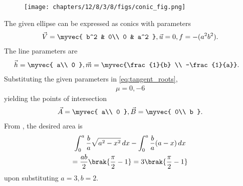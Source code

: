 	\begin{figure}[H]
		\centering
 \texttt{[image: chapters/12/8/3/8/figs/conic\_fig.png]}
		\caption{}
		\label{fig:12/8/3/8}
  	\end{figure}
The given ellipse can be expressed as conics with parameters
\begin{align}
\vec{V}=\myvec{
b^2 & 0\\
0 & a^2
},
\vec{u}=0,
f=-(a^2b^2).
\end{align} 
The line parameters are
\begin{align}
\vec{h} &= \myvec{
a\\
0
},
\vec{m} = \myvec{\frac{1}{b} \\ -\frac{1}{a}}.
\end{align}
Substituting the given parameters in \eqref{eq:tangent_roots},
\begin{align}
    \mu=0,-6
\end{align}
yielding the points of intersection
\begin{align}
    \vec{A}=\myvec{
a\\
0
    },
    \vec{B}=\myvec{
0\\
b
    }.
\end{align}
From 
		,
the desired area is
\begin{multline}
\int_{0}^{a}\frac{b}{a}\sqrt{a^2-x^2} \,dx 
-\int_{0}^{a} \frac{b}{a}(a-x) \,dx
\\
	= \frac{ab}{2}\brak{\frac{\pi}{2}-1}
	= 3\brak{\frac{\pi}{2}-1}
\end{multline}
upon substituting $a=3, b=2$.
